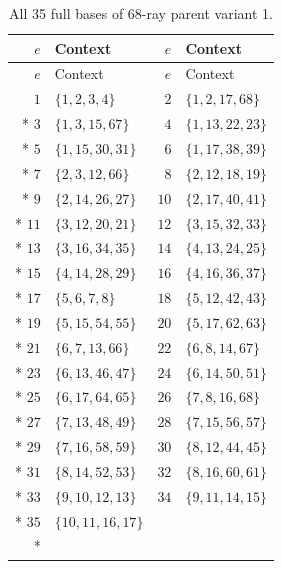 \documentclass[aps,pra,reprint,superscriptaddress,longbibliography,nofootinbib,floatfix,10pt]{revtex4-2}
\theoremstyle{definition}
\begin{document}
\begin{longtable}{rlrl}
\caption{All 35 full bases of 68-ray parent variant 1.}\label{tab:cabello68-1-contexts}\\
\toprule
$e$ & Context & $e$ & Context\\\midrule
\endfirsthead
\toprule
$e$ & Context & $e$ & Context\\\midrule
\endhead
\bottomrule\endfoot
$1$ & $\{1,2,3,4\}$ & $2$ & $\{1,2,17,68\}$\\*
$3$ & $\{1,3,15,67\}$ & $4$ & $\{1,13,22,23\}$\\*
$5$ & $\{1,15,30,31\}$ & $6$ & $\{1,17,38,39\}$\\*
$7$ & $\{2,3,12,66\}$ & $8$ & $\{2,12,18,19\}$\\*
$9$ & $\{2,14,26,27\}$ & $10$ & $\{2,17,40,41\}$\\*
$11$ & $\{3,12,20,21\}$ & $12$ & $\{3,15,32,33\}$\\*
$13$ & $\{3,16,34,35\}$ & $14$ & $\{4,13,24,25\}$\\*
$15$ & $\{4,14,28,29\}$ & $16$ & $\{4,16,36,37\}$\\*
$17$ & $\{5,6,7,8\}$ & $18$ & $\{5,12,42,43\}$\\*
$19$ & $\{5,15,54,55\}$ & $20$ & $\{5,17,62,63\}$\\*
$21$ & $\{6,7,13,66\}$ & $22$ & $\{6,8,14,67\}$\\*
$23$ & $\{6,13,46,47\}$ & $24$ & $\{6,14,50,51\}$\\*
$25$ & $\{6,17,64,65\}$ & $26$ & $\{7,8,16,68\}$\\*
$27$ & $\{7,13,48,49\}$ & $28$ & $\{7,15,56,57\}$\\*
$29$ & $\{7,16,58,59\}$ & $30$ & $\{8,12,44,45\}$\\*
$31$ & $\{8,14,52,53\}$ & $32$ & $\{8,16,60,61\}$\\*
$33$ & $\{9,10,12,13\}$ & $34$ & $\{9,11,14,15\}$\\*
$35$ & $\{10,11,16,17\}$ & & \\*
\end{longtable}
\endgroup
\begingroup\small
{}
\end{document}
